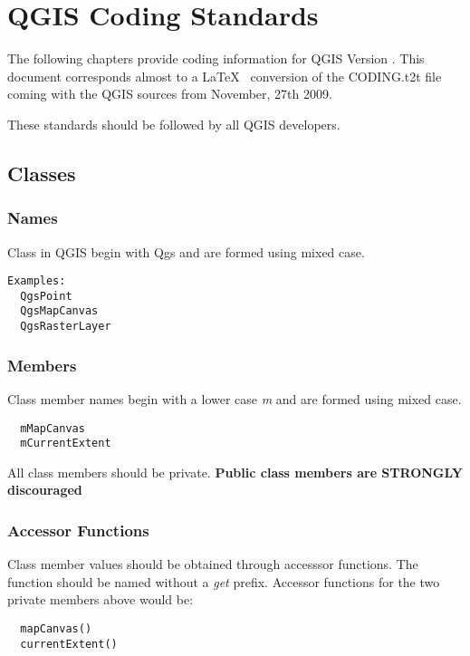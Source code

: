 

\section{QGIS Coding Standards}

The following chapters provide coding information for QGIS Version \CURRENT.
This document corresponds almost to a \LaTeX~ conversion of the CODING.t2t
file coming with the QGIS sources from November, 27th 2009.

These standards should be followed by all QGIS developers.

\subsection{Classes}
\subsubsection{Names}
Class in QGIS begin with Qgs and are formed using mixed case. 

\begin{verbatim}
Examples:
  QgsPoint
  QgsMapCanvas
  QgsRasterLayer
\end{verbatim}

\subsubsection{Members}
Class member names begin with a lower case \textit{m} and are formed using mixed
case.

\begin{verbatim}
  mMapCanvas  
  mCurrentExtent
\end{verbatim}

All class members should be private.
\textbf{Public class members are STRONGLY discouraged}

\subsubsection{Accessor Functions}
Class member values should be obtained through accesssor functions. The
function should be named without a \textit{get} prefix. Accessor functions for the
two private members above would be: 

\begin{verbatim}
  mapCanvas()
  currentExtent()
\end{verbatim}

